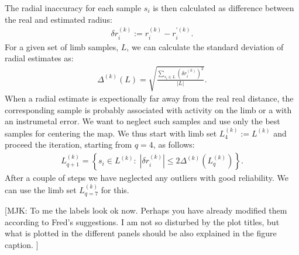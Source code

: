 \documentclass{aa}
\newcommand{\mjk}[1]{\textcolor{midgreen}{[MJK: #1]}} %
\newcommand{\eqnl}[2]{\begin{eqnarray}\label{#1}#2\end{eqnarray}}
\begin{document}
  The radial inaccuracy for each sample $s_i$ is then calculated as difference between the real and estimated radius:
  \eqnl{calib_deviation1}{
  \delta r_i^{(k)} := r_i^{(k)} - r_i^{\prime(k)} \text{.}
  }
  For a given set of limb samples, $L$, we can calculate the standard deviation of radial estimates as:
  \eqnl{calib_deviation2}{
  \Delta^{(k)}(L) = \sqrt{\frac{\sum \limits_{s_i \in L} \left( \delta r_i^{(k)} \right)^2}{|L|}} \text{.}
  }
  When a radial estimate is expectionally far away from the real real distance, the corresponding sample is probably associated with activity on the limb or a with an instrumetal error. We want to neglect such samples and use only the best samples for centering the map. We thus start with limb set $L^{(k)}_4 := L^{(k)}$ and proceed the iteration, starting from $q=4$, as follows:
  \eqnl{calib_deviation3}{
  L^{(k)}_{q+1} = \left\{ s_i \in L^{(k)} : \; |\delta r_i^{(k)}| \le 2 \Delta^{(k)}\left( L^{(k)}_{q} \right) \right\} \text{.}
  }
  After a couple of steps we have neglected any outliers with good reliability. We can use the limb set $L^{(k)}_{q=7}$ for this.
  
  
  


  
  \mjk{To me the labels look ok now. Perhaps you have already modified them according to Fred's suggestions. I am not so disturbed by the plot titles, but what is plotted in the different panels should be also explained in the figure caption. }
  
\end{document}
